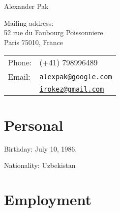 \documentclass[letterpaper]{article}
\def\name{Alexander Pak}
\renewenvironment{itemize}{
  \begin{list}{}{
    \setlength{\leftmargin}{0.6em}
  }
}{
  \end{list}
}
\begin{document}
{\huge \name}


\vspace{0.25in}

\begin{minipage}{0.45\linewidth}
	Mailing address:\\
	52 rue du Faubourg Poissonniere \\
	Paris 75010, France
\end{minipage}
\begin{minipage}{0.45\linewidth}
  \begin{tabular}{ll}
    Phone: & (+41) 798996489 \\
    Email: & \href{mailto:alexpak@google.com}{\tt alexpak@google.com}\\
	       & \href{mailto:irokez@gmail.com}{\tt irokez@gmail.com}
  \end{tabular}
\end{minipage}

\section*{Personal}

\begin{itemize}
\item Birthday: July 10, 1986.
\item Nationality: Uzbekistan
\end{itemize}


\section*{Employment}
\end{document}
